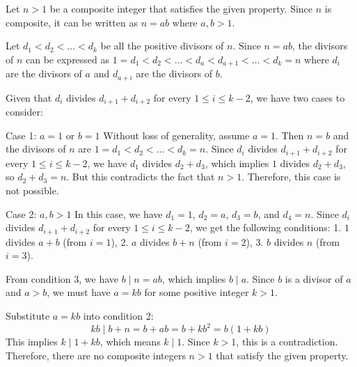 Let \( n > 1 \) be a composite integer that satisfies the given property. Since \( n \) is composite, it can be written as \( n = ab \) where \( a, b > 1 \). 

Let \( d_1 < d_2 < \dots < d_k \) be all the positive divisors of \( n \). Since \( n = ab \), the divisors of \( n \) can be expressed as \( 1 = d_1 < d_2 < \dots < d_a < d_{a+1} < \dots < d_k = n \) where \( d_i \) are the divisors of \( a \) and \( d_{a+i} \) are the divisors of \( b \).

Given that \( d_i \) divides \( d_{i+1} + d_{i+2} \) for every \( 1 \leq i \leq k - 2 \), we have two cases to consider:

Case 1: \( a = 1 \) or \( b = 1 \)
Without loss of generality, assume \( a = 1 \). Then \( n = b \) and the divisors of \( n \) are \( 1 = d_1 < d_2 < \dots < d_k = n \). Since \( d_i \) divides \( d_{i+1} + d_{i+2} \) for every \( 1 \leq i \leq k - 2 \), we have \( d_1 \) divides \( d_2 + d_3 \), which implies \( 1 \) divides \( d_2 + d_3 \), so \( d_2 + d_3 = n \). But this contradicts the fact that \( n > 1 \). Therefore, this case is not possible.

Case 2: \( a, b > 1 \)
In this case, we have \( d_1 = 1 \), \( d_2 = a \), \( d_3 = b \), and \( d_4 = n \). Since \( d_i \) divides \( d_{i+1} + d_{i+2} \) for every \( 1 \leq i \leq k - 2 \), we get the following conditions:
1. \( 1 \) divides \( a + b \) (from \( i = 1 \)),
2. \( a \) divides \( b + n \) (from \( i = 2 \)),
3. \( b \) divides \( n \) (from \( i = 3 \)).

From condition 3, we have \( b \mid n = ab \), which implies \( b \mid a \). Since \( b \) is a divisor of \( a \) and \( a > b \), we must have \( a = kb \) for some positive integer \( k > 1 \).

Substitute \( a = kb \) into condition 2:
\[ kb \mid b + n = b + ab = b + kb^2 = b(1 + kb) \]
This implies \( k \mid 1 + kb \), which means \( k \mid 1 \). Since \( k > 1 \), this is a contradiction. Therefore, there are no composite integers \( n > 1 \) that satisfy the given property.
